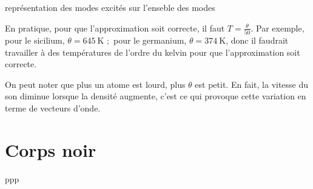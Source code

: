 \begin{marginfigure}
    \TODO
    \caption{représentation des modes excités sur l'enseble des modes}
\end{marginfigure}

En pratique, pour que l'approximation soit correcte, il faut
$T=\frac{\theta}{50}$. Par exemple, pour le sicilium,
$\theta = \SI{645}{\kelvin}$ ; pour le germanium,
$\theta = \SI{374}{\kelvin}$, donc il faudrait travailler à des températures de 
l'ordre du kelvin pour que l'approximation soit correcte.

On peut noter que plus un atome est lourd, plus $\theta$ est petit. En fait,
la vitesse du son diminue lorsque la densité augmente, c'est ce qui provoque
cette variation en terme de vecteurs d'onde.

\section{Corps noir}
ppp
